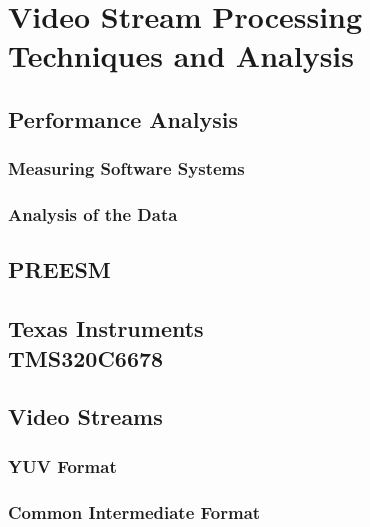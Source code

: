 \chapter{Video Stream Processing Techniques and Analysis}
\label{chapter:experiments}


\section{Performance Analysis}
\label{sec:performance-analysis}


\subsection{Measuring Software Systems}
\label{subsec:measuring-software}


\subsection{Analysis of the Data}
\label{subsec:data-analysis}


\section{PREESM}
\label{sec:preesm}


\section[Texas Instruments TMS320C6678]{Texas Instruments\\TMS320C6678}
\label{sec:c6678}


\section{Video Streams}
\label{sec:video-streams}

\subsection{YUV Format}
\label{subsec:yuv}

\subsection{Common Intermediate Format}
\label{subsec:cif}

